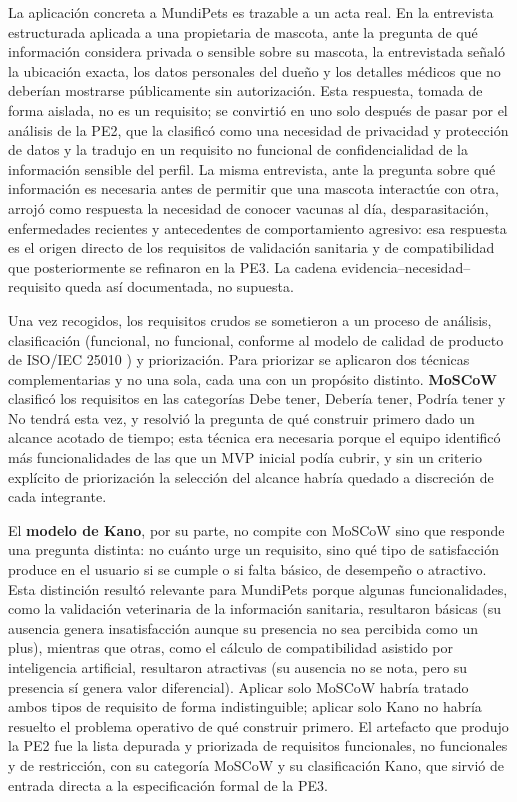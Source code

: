 \documentclass[journal,onecolumn]{IEEEtran}
\begin{document}
La aplicación concreta a MundiPets es trazable a un acta real. En la entrevista
estructurada aplicada a una propietaria de mascota, ante la pregunta de qué información
considera privada o sensible sobre su mascota, la entrevistada señaló la ubicación exacta,
los datos personales del dueño y los detalles médicos que no deberían mostrarse
públicamente sin autorización. Esta respuesta, tomada de forma aislada, no es un requisito;
se convirtió en uno solo después de pasar por el análisis de la PE2, que la clasificó como
una necesidad de privacidad y protección de datos y la tradujo en un requisito no funcional
de confidencialidad de la información sensible del perfil. La misma entrevista, ante la
pregunta sobre qué información es necesaria antes de permitir que una mascota interactúe
con otra, arrojó como respuesta la necesidad de conocer vacunas al día, desparasitación,
enfermedades recientes y antecedentes de comportamiento agresivo: esa respuesta es el
origen directo de los requisitos de validación sanitaria y de compatibilidad que
posteriormente se refinaron en la PE3. La cadena evidencia--necesidad--requisito queda así
documentada, no supuesta.

Una vez recogidos, los requisitos crudos se sometieron a un proceso de análisis,
clasificación (funcional, no funcional, conforme al modelo de calidad de producto de
ISO/IEC 25010 \cite{iso25010}) y priorización. Para priorizar se aplicaron dos técnicas
complementarias y no una sola, cada una con un propósito distinto. \textbf{MoSCoW}
clasificó los requisitos en las categorías Debe tener, Debería tener, Podría tener y No
tendrá esta vez, y resolvió la pregunta de qué construir primero dado un alcance acotado de
tiempo; esta técnica era necesaria porque el equipo identificó más funcionalidades de las
que un MVP inicial podía cubrir, y sin un criterio explícito de priorización la selección
del alcance habría quedado a discreción de cada integrante. 

El \textbf{modelo de Kano}, por
su parte, no compite con MoSCoW sino que responde una pregunta distinta: no cuánto urge un
requisito, sino qué tipo de satisfacción produce en el usuario si se cumple o si falta
 básico, de desempeño o atractivo. Esta distinción resultó relevante para MundiPets
porque algunas funcionalidades, como la validación veterinaria de la información sanitaria,
resultaron básicas (su ausencia genera insatisfacción aunque su presencia no sea percibida
como un plus), mientras que otras, como el cálculo de compatibilidad asistido por
inteligencia artificial, resultaron atractivas (su ausencia no se nota, pero su presencia
sí genera valor diferencial). Aplicar solo MoSCoW habría tratado ambos tipos de requisito
de forma indistinguible; aplicar solo Kano no habría resuelto el problema operativo de
qué construir primero. El artefacto que produjo la PE2 fue la lista depurada y priorizada
de requisitos funcionales, no funcionales y de restricción, con su categoría MoSCoW y su
clasificación Kano, que sirvió de entrada directa a la especificación formal de la PE3.
\end{document}
